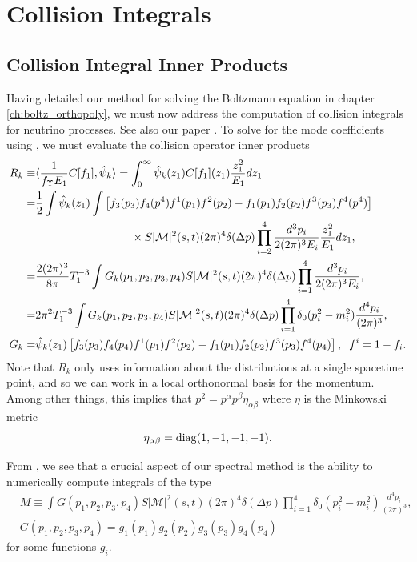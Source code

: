 
\section{ Collision Integrals}\label{ch:coll_simp}


\subsection{Collision Integral Inner Products}\label{coll_simp_sec}
Having detailed our method for solving the Boltzmann equation in chapter \ref{ch:boltz_orthopoly}, we must now address the computation of  collision integrals for neutrino processes.   See also our paper \cite{Birrell:2014uka}. To solve for the mode coefficients using , we must evaluate the collision operator inner products
\begin{align}\label{collision_integrals}
R_k\equiv&\langle\frac{1}{f_\Upsilon E_1}C[f_1],\hat\psi_k\rangle=\int_0^\infty \hat\psi_k(z_1)C[f_1](z_1) \frac{z_1^2}{E_1}dz_1\\
=&\frac{1}{2}\int \hat\psi_k(z_1)\int\left[f_3(p_3)f_4(p^4)f^1(p_1)f^2(p_2)-f_1(p_1)f_2(p_2)f^3(p_3)f^4(p^4)\right]\\
&\hspace{30mm}\times S |\mathcal{M}|^2(s,t)(2\pi)^4\delta(\Delta p)\prod_{i=2}^4\frac{d^{3}p_i}{2(2\pi)^3E_i}\frac{z_1^2}{E_1}dz_1,\notag\\
=&\frac{2(2\pi)^3}{8\pi}T_1^{-3}\int G_k(p_1,p_2,p_3,p_4)S |\mathcal{M}|^2(s,t)(2\pi)^4\delta(\Delta p)\prod_{i=1}^4\frac{d^{3}p_i}{2(2\pi)^3E_i},\\
=&2\pi^2T_1^{-3}\int G_k(p_1,p_2,p_3,p_4)S |\mathcal{M}|^2(s,t)(2\pi)^4\delta(\Delta p)\prod_{i=1}^4 \delta_0(p_i^2-m_i^2)\frac{d^4p_i}{(2\pi)^3},\\
G_k=&\hat\psi_k(z_1)\left[f_3(p_3)f_4(p_4)f^1(p_1)f^2(p_2)-f_1(p_1)f_2(p_2)f^3(p_3)f^4(p_4)\right],\hspace{2mm} f^i=1- f_i.
\end{align}
Note that $R_k$ only uses information about the distributions at a single spacetime point, and so we can work in a local orthonormal basis for the momentum.  Among other things, this implies that $p^2=p^\alpha p^\beta\eta_{\alpha\beta}$ where $\eta$ is the Minkowski metric
\begin{equation}
\eta_{\alpha\beta}=\mathrm{diag}(1,-1,-1,-1).
\end{equation}

From , we see that a crucial aspect of our spectral method is the ability to numerically compute  integrals of the type
\begin{align}\label{coll_ip}
&M\equiv\int G(p_1,p_2,p_3,p_4) S |\mathcal{M}|^2(s,t) (2\pi)^4\delta(\Delta p)\prod_{i=1}^4 \delta_0(p_i^2-m_i^2)\frac{d^4p_i}{(2\pi)^3},\\
&G(p_1,p_2,p_3,p_4)=g_1(p_1)g_2(p_2)g_3(p_3)g_4(p_4)
\end{align}
for some functions $g_i$.

